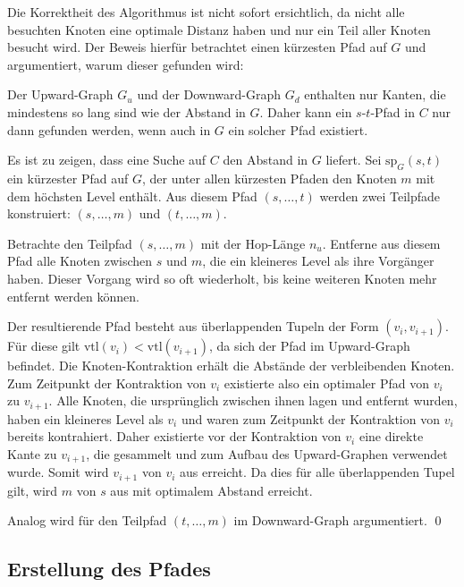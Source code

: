 Die Korrektheit des Algorithmus ist nicht sofort ersichtlich, da nicht alle besuchten Knoten eine optimale Distanz haben und nur ein Teil aller Knoten besucht wird.
Der Beweis hierfür betrachtet einen kürzesten Pfad auf $G$ und argumentiert, warum dieser gefunden wird:


\begin{beweis}\label{ch:proof:correct}
  Der Upward-Graph $G_u$ und der Downward-Graph $G_d$ enthalten nur Kanten, die mindestens so lang sind wie der Abstand in $G$.
  Daher kann ein $s$-$t$-Pfad in $C$ nur dann gefunden werden, wenn auch in $G$ ein solcher Pfad existiert.

  Es ist zu zeigen, dass eine Suche auf $C$ den Abstand in $G$ liefert.
  Sei $\text{sp}_G(s, t)$ ein kürzester Pfad auf $G$, der unter allen kürzesten Pfaden den Knoten $m$ mit dem höchsten Level enthält.
  Aus diesem Pfad $(s, \dotsc, t)$ werden zwei Teilpfade konstruiert: $(s, \dotsc, m)$ und $(t, \dotsc, m)$.

  Betrachte den Teilpfad $(s, \dotsc, m)$ mit der Hop-Länge $n_u$.
  Entferne aus diesem Pfad alle Knoten zwischen $s$ und $m$, die ein kleineres Level als ihre Vorgänger haben.
  Dieser Vorgang wird so oft wiederholt, bis keine weiteren Knoten mehr entfernt werden können.

  Der resultierende Pfad besteht aus überlappenden Tupeln der Form $(v_{i}, v_{i + 1})$.
  Für diese gilt $\text{vtl}(v_i) < \text{vtl}(v_{i + 1})$, da sich der Pfad im Upward-Graph befindet.
  Die Knoten-Kontraktion erhält die Abstände der verbleibenden Knoten.
  Zum Zeitpunkt der Kontraktion von $v_i$ existierte also ein optimaler Pfad von $v_i$ zu $v_{i + 1}$.
  Alle Knoten, die ursprünglich zwischen ihnen lagen und entfernt wurden, haben ein kleineres Level als $v_i$ und waren zum Zeitpunkt der Kontraktion von $v_i$ bereits kontrahiert.
  Daher existierte vor der Kontraktion von $v_i$ eine direkte Kante zu $v_{i + 1}$, die gesammelt und zum Aufbau des Upward-Graphen verwendet wurde.
  Somit wird $v_{i + 1}$ von $v_i$ aus erreicht.
  Da dies für alle überlappenden Tupel gilt, wird $m$ von $s$ aus mit optimalem Abstand erreicht.

  Analog wird für den Teilpfad $(t, \dotsc, m)$ im Downward-Graph argumentiert.
  \qed
\end{beweis}

\subsection{Erstellung des Pfades}\label{ch:subsection:pfad_gewinnung}

